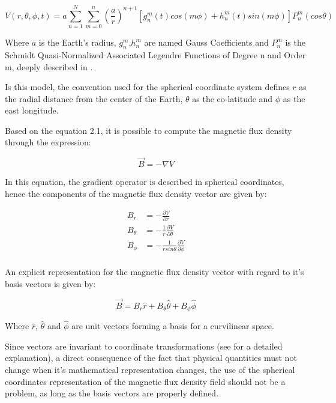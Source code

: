\begin{equation}
	V(r,\theta,\phi,t) = a \sum_{n=1}^{N} \sum_{m=0}^n\left(  \frac{a}{r}\right)^{n+1}\left[g_{n}^{m}\left(t\right)cos\left(m\phi\right) + h_{n}^{m}\left(t\right)sin\left(m\phi\right)\right]P_{n}^{m}\left(cos\theta\right)
\end{equation} 

\indent
Where $a$ is the Earth's radius, $g_{n}^{m}$,$h_{n}^m$ are named Gauss Coefficients and $P_{n}^{m}$ is the Schmidt Quasi-Normalized Associated Legendre Functions of Degree n and Order m, deeply described in \cite{DW}.

\indent
Is this model, the convention used for the spherical coordinate system defines $r$ as the radial distance from the center of the Earth, $\theta$ as the co-latitude and $\phi$ as the east longitude.

\indent 
Based on the equation 2.1, it is possible to compute the magnetic flux density through the expression:

\begin{equation}
	\vec{B} = - \nabla V
\end{equation}

\indent
In this equation, the gradient operator is described in spherical coordinates, hence the components of the magnetic flux density vector are given by:

\begin{align*}
	B_{r} &= -\frac{\partial V}{\partial r}    \\	
	B_{\theta} &= -\frac{1}{r}\frac{\partial V}{\partial \theta}   \\
	B_{\phi} &= -\frac{1}{r sin \theta}\frac{\partial V}{\partial \phi}    \\
\end{align*}

\indent
An explicit representation for the magnetic flux density vector with regard to it's basis vectors is given by:

\begin{equation}
	\vec{B} = B_{r}\hat{r} + B_{\theta}\hat{\theta} + B_{\phi}\hat{\phi}
\end{equation}

\indent
Where $\hat{r}$, $\hat{\theta}$ and $\hat{\phi}$ are unit vectors forming a basis for a curvilinear space. 

\indent
Since vectors are invariant to coordinate transformations (see \cite{AH} for a detailed explanation), a direct consequence of the fact that physical quantities must not change when it's mathematical representation changes, the use of the spherical coordinates representation of the magnetic flux density field should not be a problem, as long as the basis vectors are properly defined.

